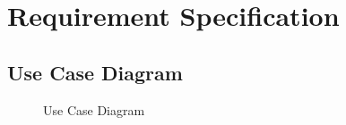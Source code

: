 \section{Requirement Specification}

\subsection{Use Case Diagram}
\begin{figure}[h]
\setlength\fboxsep{0pt}
\setlength\fboxrule{0.2pt}
\caption{Use Case Diagram}
\end{figure}





